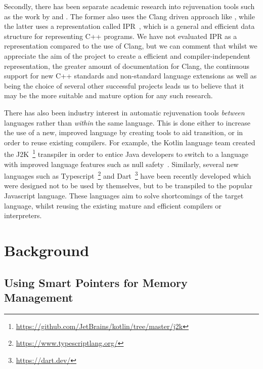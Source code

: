 \documentclass{mpaper}
\begin{document}
    Secondly, there has been separate academic research into rejuvenation tools such as the work by \citet{Huck2016} and \citet{Kumar2012}.
    The former also uses the Clang driven approach like \citet{Wright2013}, while the latter uses a representation called IPR~\cite{Dos2011}, which is a general and efficient data structure for representing C++ programs.
    We have not evaluated IPR as a representation compared to the use of Clang, but we can  comment that whilst we appreciate the aim of the project to create a efficient and compiler-independent representation, the greater amount of documentation for Clang, the continuous support for new C++ standards and non-standard language extensions as well as being the choice of several other successful projects leads us to believe that it may be the more suitable and mature option for any such research.
    
    There has also been industry interest in automatic rejuvenation tools \emph{between} languages rather than \emph{within} the same language. 
    This is done either to increase the use of a new, improved language by creating tools to aid transition, or in order to reuse existing compilers.
    For example, the Kotlin language team created the J2K~\footnote{\url{https://github.com/JetBrains/kotlin/tree/master/j2k}} transpiler in order to entice Java developers to switch to a language with improved language features such as null safety~\cite{Mateus2019}. 
    Similarly, several new languages such as Typescript~\footnote{\url{https://www.typescriptlang.org/}} and Dart~\footnote{\url{https://dart.dev/}} have been recently developed which were designed not to be used by themselves, but to be transpiled to the popular Javascript language.
    These languages aim to solve shortcomings of the target language, whilst reusing the existing mature and efficient compilers or interpreters.




    \section{Background}\label{sec:background}
    
    \subsection{Using Smart Pointers for Memory Management}\label{subsec:using-smart-pointers-for-memory-management}
\end{document}
